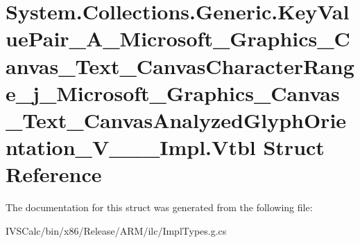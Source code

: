 \hypertarget{struct_system_1_1_collections_1_1_generic_1_1_key_value_pair___a___microsoft___graphics___canvasf30993b2acb1fed509f8c41a3065c314}{}\section{System.\+Collections.\+Generic.\+Key\+Value\+Pair\+\_\+\+A\+\_\+\+Microsoft\+\_\+\+Graphics\+\_\+\+Canvas\+\_\+\+Text\+\_\+\+Canvas\+Character\+Range\+\_\+j\+\_\+\+Microsoft\+\_\+\+Graphics\+\_\+\+Canvas\+\_\+\+Text\+\_\+\+Canvas\+Analyzed\+Glyph\+Orientation\+\_\+\+V\+\_\+\+\_\+\+\_\+\+Impl.\+Vtbl Struct Reference}
\label{struct_system_1_1_collections_1_1_generic_1_1_key_value_pair___a___microsoft___graphics___canvasf30993b2acb1fed509f8c41a3065c314}


The documentation for this struct was generated from the following file\+:\begin{DoxyCompactItemize}
\item 
I\+V\+S\+Calc/bin/x86/\+Release/\+A\+R\+M/ilc/Impl\+Types.\+g.\+cs\end{DoxyCompactItemize}
